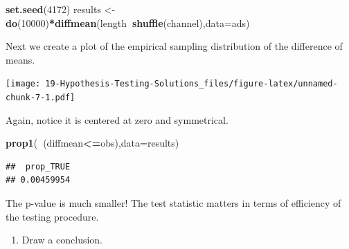 \documentclass[
]{book}
\newenvironment{Shaded}{\begin{snugshade}}{\end{snugshade}}
\newcommand{\DataTypeTok}[1]{\textcolor[rgb]{0.13,0.29,0.53}{#1}}
\newcommand{\DecValTok}[1]{\textcolor[rgb]{0.00,0.00,0.81}{#1}}
\newcommand{\KeywordTok}[1]{\textcolor[rgb]{0.13,0.29,0.53}{\textbf{#1}}}
\newcommand{\NormalTok}[1]{#1}
\newcommand{\OperatorTok}[1]{\textcolor[rgb]{0.81,0.36,0.00}{\textbf{#1}}}
\newcommand{\StringTok}[1]{\textcolor[rgb]{0.31,0.60,0.02}{#1}}
\providecommand{\tightlist}{%
  \setlength{\itemsep}{0pt}\setlength{\parskip}{0pt}}
\begin{document}
\begin{Shaded}
\begin{Highlighting}[]
\KeywordTok{set.seed}\NormalTok{(}\DecValTok{4172}\NormalTok{)}
\NormalTok{results <-}\StringTok{ }\KeywordTok{do}\NormalTok{(}\DecValTok{10000}\NormalTok{)}\OperatorTok{*}\KeywordTok{diffmean}\NormalTok{(length}\OperatorTok{~}\KeywordTok{shuffle}\NormalTok{(channel),}\DataTypeTok{data=}\NormalTok{ads)}
\end{Highlighting}
\end{Shaded}

Next we create a plot of the empirical sampling distribution of the difference of means.

\begin{Shaded}
\end{Shaded}

\texttt{[image: 19-Hypothesis-Testing-Solutions\_files/figure-latex/unnamed-chunk-7-1.pdf]}

Again, notice it is centered at zero and symmetrical.

\begin{Shaded}
\begin{Highlighting}[]
\KeywordTok{prop1}\NormalTok{(}\OperatorTok{~}\NormalTok{(diffmean}\OperatorTok{<=}\NormalTok{obs),}\DataTypeTok{data=}\NormalTok{results)}
\end{Highlighting}
\end{Shaded}

\begin{verbatim}
##  prop_TRUE 
## 0.00459954
\end{verbatim}

The p-value is much smaller! The test statistic matters in terms of efficiency of the testing procedure.

\begin{enumerate}
\def\labelenumi{\arabic{enumi}.}
\setcounter{enumi}{3}
\tightlist
\item
  Draw a conclusion.
\end{enumerate}
\end{document}

